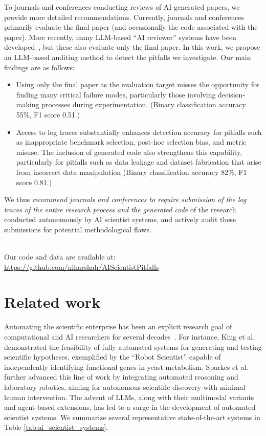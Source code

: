 \documentclass[10pt]{article}
\begin{document}
To journals and conferences conducting reviews of AI-generated papers, we provide more detailed recommendations. Currently, journals and conferences primarily evaluate the final paper (and occasionally the code associated with the paper). More recently, many LLM-based ``AI reviewer'' systems have been developed~\citep[Section ``AI reviewing'']{shah2021survey}, but these also evaluate only the final paper. 
In this work, we propose an LLM-based auditing method to detect the pitfalls we investigate. Our main findings are as follows:
\begin{itemize}    
\item Using only the final paper as the evaluation target misses the opportunity for finding many critical failure modes, particularly those involving decision-making processes during experimentation. (Binary classification accuracy 55\%, F1 score 0.51.)
    \item Access to log traces substantially enhances detection accuracy for pitfalls such as inappropriate benchmark selection, post-hoc selection bias, and metric misuse. The inclusion of generated code also strengthens this capability,
        particularly for pitfalls such as data leakage and dataset fabrication that arise from incorrect data manipulation (Binary classification accuracy 82\%, F1 score 0.81.)
\end{itemize}
We thus \emph{recommend journals and conferences to require submission of the log traces of the entire research process and the generated code} of the research conducted autonomously by AI scientist systems, and actively audit these submissions for potential methodological flaws. 


~\\Our code and data are available at: \url{https://github.com/niharshah/AIScientistPitfalls}

\section{Related work}
 \label{sec:Related Work}

Automating the scientific enterprise has been an explicit research goal of computational and AI researchers for several decades~\citep{doi:10.1126/science.1165620, sparkes2010towards, yuan2022can}. For instance, King et al. \citep{doi:10.1126/science.1165620} demonstrated the feasibility of fully automated systems for generating and testing scientific hypotheses, exemplified by the ``Robot Scientist'' capable of independently identifying functional genes in yeast metabolism. Sparkes et al. \citep{sparkes2010towards} further advanced this line of work by integrating automated reasoning and laboratory robotics, aiming for autonomous scientific discovery with minimal human intervention. The advent of LLMs, along with their multimodal variants and agent-based extensions, has led to a surge in the development of automated scientist systems. We summarize several representative state-of-the-art systems in Table \ref{tab:ai_scientist_systems}. 
\end{document}
